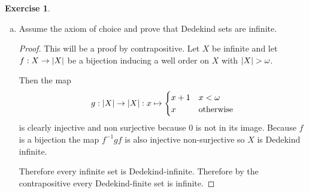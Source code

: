 \documentclass{article}
\theoremstyle{definition}
\newtheorem{question}{Exercise}
\newcommand{\set}[1]{\left\{#1\right\}}
\newcommand{\setwith}[2]{\set{#1\colon#2}}
\newcommand{\powset}{\mathcal{P}}
\DeclarePairedDelimiter{\abs}{|}{|}
\begin{document}
\begin{question}
\begin{enumerate}[a.]
\begin{proof}
                  \((2)\Rightarrow(3)\) Let \(X\) be a \(T\)-finite set and let
                  \(Y\) be the smallest set containing the singletons
                  \(\set{x}\) for all \(x\in X\) which is closed under union.
                  Consider any \(Z\subseteq X\) and consider \(Y'=\powset(Z)\cap
                  Y\). By \(T\)-maximality this set has a maximal element
                  \(A\subseteq Z\). If \(A\neq Z\) then there is an \(a\in
                  Z\setminus A\) so \(A\subsetneq A\cup\set{a}\subseteq Z\) is a
                  larger subset of \(Z\) contained in \(Y\). Therefore \(A=Z\)
                  so each subset \(Z\subseteq X\) is an element of \(Y\).

                  \((3)\Rightarrow(1)\) This will be a proof by contrapositive.
                  Let \(X\) be an infinite set and consider
                  \[
                      Y=\setwith{A\in\powset(X)}{\textnormal{\(A\) is finite}}.
                  \]
                  Then \(Y\) clearly contains all singletons and is closed under
                  union because the union of countable sets is countable.
                  However \(X\subseteq X\) is infinite so \(X\notin Y\). This
                  means that \(Y\neq\powset(X)\).
              \end{proof}

        \item Assume the axiom of choice and prove that Dedekind sets are
              infinite.

              \begin{proof}
                  This will be a proof by contrapositive. Let \(X\) be infinite
                  and let \(f:X\to\abs{X}\) be a bijection inducing a well order
                  on \(X\) with \(\abs{X}>\omega\).

                  Then the map
                  \[
                      g:\abs{X}\to\abs{X}:x\mapsto\begin{cases}
                          x+1 & x<\omega               \\
                          x   & \textnormal{otherwise}
                      \end{cases}
                  \]
                  is clearly injective and non surjective because \(0\) is not
                  in its image. Because \(f\) is a bijection the map
                  \(f^{-1}gf\) is also injective non-surjective so \(X\) is
                  Dedekind infinite.

                  Therefore every infinite set is Dedekind-infinite. Therefore
                  by the contrapositive every Dedekind-finite set is infinite.
              \end{proof}
    \end{enumerate}
\end{question}
\end{document}
